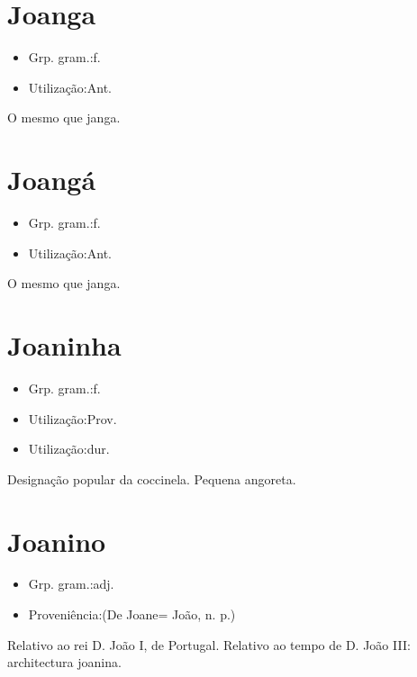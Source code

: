 \documentclass{article}
\begin{document}
\section{Joanga}
\begin{itemize}
\item {Grp. gram.:f.}
\end{itemize}
\begin{itemize}
\item {Utilização:Ant.}
\end{itemize}
O mesmo que \textunderscore janga\textunderscore .
\section{Joangá}
\begin{itemize}
\item {Grp. gram.:f.}
\end{itemize}
\begin{itemize}
\item {Utilização:Ant.}
\end{itemize}
O mesmo que \textunderscore janga\textunderscore .
\section{Joaninha}
\begin{itemize}
\item {Grp. gram.:f.}
\end{itemize}
\begin{itemize}
\item {Utilização:Prov.}
\end{itemize}
\begin{itemize}
\item {Utilização:dur.}
\end{itemize}
Designação popular da coccinela.
Pequena angoreta.
\section{Joanino}
\begin{itemize}
\item {Grp. gram.:adj.}
\end{itemize}
\begin{itemize}
\item {Proveniência:(De \textunderscore Joane\textunderscore  = \textunderscore João\textunderscore , n. p.)}
\end{itemize}
Relativo ao rei D. João I, de Portugal.
Relativo ao tempo de D. João III: \textunderscore architectura joanina\textunderscore .
\end{document}
